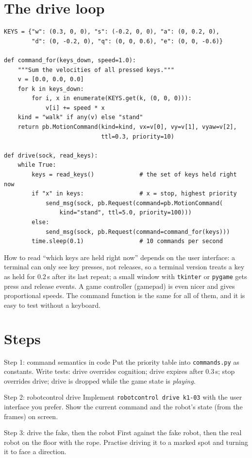 \section*{The drive loop}
\begin{verbatim}
KEYS = {"w": (0.3, 0, 0), "s": (-0.2, 0, 0), "a": (0, 0.2, 0),
        "d": (0, -0.2, 0), "q": (0, 0, 0.6), "e": (0, 0, -0.6)}

def command_for(keys_down, speed=1.0):
    """Sum the velocities of all pressed keys."""
    v = [0.0, 0.0, 0.0]
    for k in keys_down:
        for i, x in enumerate(KEYS.get(k, (0, 0, 0))):
            v[i] += speed * x
    kind = "walk" if any(v) else "stand"
    return pb.MotionCommand(kind=kind, vx=v[0], vy=v[1], vyaw=v[2],
                            ttl=0.3, priority=10)

def drive(sock, read_keys):
    while True:
        keys = read_keys()             # the set of keys held right now
        if "x" in keys:                # x = stop, highest priority
            send_msg(sock, pb.Request(command=pb.MotionCommand(
                kind="stand", ttl=5.0, priority=100)))
        else:
            send_msg(sock, pb.Request(command=command_for(keys)))
        time.sleep(0.1)                # 10 commands per second
\end{verbatim}
How to read ``which keys are held right now'' depends on the user interface: a terminal can only see key presses, not releases, so a terminal version treats a key as held for $0.2$\,s after its last repeat; a small window with \texttt{tkinter} or \texttt{pygame} gets press and release events. A game controller (gamepad) is even nicer and gives proportional speeds. The command function is the same for all of them, and it is easy to test without a keyboard.

\section*{Steps}
\begin{stepbox}{Step 1: command semantics in code}
Put the priority table into \texttt{commands.py} as constants. Write tests: drive overrides cognition; drive expires after $0.3$\,s; stop overrides drive; drive is dropped while the game state is \emph{playing}.
\end{stepbox}
\begin{stepbox}{Step 2: robotcontrol drive}
Implement \verb!robotcontrol drive k1-03! with the user interface you prefer. Show the current command and the robot's state (from the frames) on screen.
\end{stepbox}
\begin{stepbox}{Step 3: drive the fake, then the robot}
First against the fake robot, then the real robot on the floor with the rope. Practise driving it to a marked spot and turning it to face a direction.
\end{stepbox}

